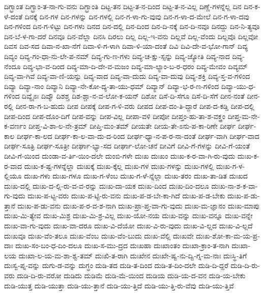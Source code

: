 {ದಿಗ್ಭ್ರಾಂತ
ದಿಗ್ಭ್ರಾಂ-ತ-ನಾ-ಗು-ವನು
ದಿಗ್ಭ್ರಾಂತಿ
ದಿಟ್ಟ-ತನ
ದಿಟ್ಟ-ತ-ನ-ದಿಂದ
ದಿಟ್ಟ-ತ-ನ-ವಿಲ್ಲ
ದಿಣ್ಣೆ-ಗಳನ್ನೆಲ್ಲ
ದಿನ
ದಿನ-ಕ-ಳೆ-ದಂತೆ
ದಿನಕ್ಕೆ
ದಿನ-ಗಳ
ದಿನ-ಗಳನ್ನು
ದಿನ-ಗಳಲ್ಲಿ
ದಿನ-ಗ-ಳಾ-ಗು-ವುವು
ದಿನ-ಗ-ಳಾ-ದ-ಮೇಲೆ
ದಿನ-ಗ-ಳಾ-ದವು
ದಿನ-ಗಳಿಂದ
ದಿನ-ಗ-ಳಿಟ್ಟು
ದಿನ-ಗಳು
ದಿನದ
ದಿನ-ದಲ್ಲಿ
ದಿನ-ದಿಂದ
ದಿನ-ದಿ-ನಕ್ಕೆ
ದಿನ-ದಿ-ನವೂ
ದಿನದ್ದು
ದಿನ-ನಿ-ತ್ಯವೂ
ದಿನ-ಬೆ-ಳ-ಗಾ-ದರೆ
ದಿನವೂ
ದಿನ-ವೆಲ್ಲಾ
ದಿನಸಿ
ದಿರಲು
ದಿಲ್ಲ
ದಿಲ್ಲ-ಇ-ವನು
ದಿಲ್ಲವೆ
ದಿಲ್ಲ-ವೆಂದು
ದಿಲ್ಲವೊ
ದಿಲ್ಲವೋ
ದಿವಸ
ದಿವ-ಸದ
ದಿವಾ-ನ-ಖಾ-ನೆಗೆ
ದಿವಾ-ಳಿ-ಗ-ಳಾಗಿ
ದಿವಾ-ಳಿ-ಯಾ-ದಂತೆ
ದಿವಿ
ದಿವಿ-ದೇ-ವ-ಭೋ-ಗಾನ್
ದಿವ್ಯ
ದಿವ್ಯಂ
ದಿವ್ಯ-ಗಂ-ಧಾ-ನು-ಲೇ-ಪ-ನಮ್
ದಿವ್ಯ-ಗು-ಣ-ಗಳು
ದಿವ್ಯ-ಚ-ಕ್ಷು-ಸ್ಸನ್ನು
ದಿವ್ಯ-ಜ್ಯೋತಿ
ದಿವ್ಯ-ನಾದ
ದಿವ್ಯ-ನೆಂದೂ
ದಿವ್ಯ-ಭಾ-ವ-ದಿಂದ
ದಿವ್ಯ-ಮಾ-ದಿ-ದೇ-ವ-ಮಜಂ
ದಿವ್ಯ-ಮಾ-ಲ್ಯಾಂ-ಬ-ರ-ಧರಂ
ದಿವ್ಯ-ಮೇವಂ
ದಿವ್ಯಮ್
ದಿವ್ಯ-ವಾ-ಗಿವೆ
ದಿವ್ಯ-ವಾ-ಣಿ-ಯನ್ನು
ದಿವ್ಯ-ವಾದ
ದಿವ್ಯ-ವಾ-ದುದು
ದಿವ್ಯ-ವಾ-ದುವು
ದಿವ್ಯ-ಶಕ್ತಿ
ದಿವ್ಯ-ಸ್ತ-ವ-ಗಳಿಂದ
ದಿವ್ಯಾ
ದಿವ್ಯಾ-ನಾಂ
ದಿವ್ಯಾನಿ
ದಿವ್ಯಾ-ನೇ-ಕೋ-ದ್ಯ-ತಾ-ಯು-ಧಮ್
ದಿವ್ಯಾನ್
ದಿವ್ಯಾ-ಭ-ರ-ಣ-ಗಳಿಂದ
ದಿವ್ಯಾ-ಯು-ಧ-ಗಳಿಂದ
ದಿವ್ಯೈಽಃ
ದಿವ್ಯೌ
ದಿಶಶ್ಚ
ದಿಶ-ಶ್ಚಾ-ನ-ವ-ಲೋ-ಕ-ಯನ್
ದಿಶೋ
ದಿಸೆ-ದಿ-ಸೆಗೂ
ದಿಸೆ-ದಿ-ಸೆಗೆ
ದೀನ-ನಂತೆ
ದೀನ-ರಲ್ಲಿ
ದೀನ-ರಾ-ಗ-ಬ-ಹುದು
ದೀಪ
ದೀಪಕ್ಕೆ
ದೀಪ-ಗ-ಳಿ-ವರು
ದೀಪದ
ದೀಪ-ದಂ-ತಿ-ದ್ದಾರೆ
ದೀಪ-ದ-ಕಡ್ಡಿ
ದೀಪ-ದಲ್ಲಿ
ದೀಪ-ದಿಂದ
ದೀಪ-ದೊಂ-ದಿಗೆ
ದೀಪ-ವನ್ನು
ದೀಪ-ವಿಲ್ಲ
ದೀಪಾ-ವಳಿ
ದೀಪೋ
ದೀಪ್ತಂ-ಹು-ತಾ-ಶ-ವಕ್ತ್ರಂ
ದೀಪ್ತ-ಮ-ನೇ-ಕ-ವರ್ಣಂ
ದೀಪ್ತ-ವಿ-ಶಾ-ಲ-ನೇ-ತ್ರಮ್
ದೀಪ್ತಿ-ಮಂ-ತಮ್
ದೀಯತೇ
ದೀಯ-ತೇ-ಽನು-ಪ-ಕಾ-ರಿಣೇ
ದೀರ್ಘ
ದೀರ್ಘ-ಕಾಲ
ದೀರ್ಘ-ಕಾ-ಲದ
ದೀರ್ಘ-ಕಾ-ಲ-ವಾ-ದು-ದ-ರಿಂದ
ದೀರ್ಘ-ಧ್ಯಾ-ನ-ಪ-ರ-ನಾ-ದಂತೆ
ದೀರ್ಘ-ವಾಗಿ
ದೀರ್ಘ-ವಾದ
ದೀರ್ಘ-ಸೂತ್ರಿ
ದೀರ್ಘ-ಸೂತ್ರೀ
ದೀರ್ಘಾ-ಭ್ಯಾ-ಸದ
ದೀರ್ಘಾ-ಲೋ-ಚನೆ
ದೀವಿಗೆ
ದೀವಿ-ಗೆ-ಗಳನ್ನು
ದೀವಿ-ಗೆ-ಯಂತೆ
ದೀವಿ-ಗೆ-ಯಿಂದ
ದುಂಡಾ-ವ-ರ್ತಿ-ಯಿಂ-ದಲೇ
ದುಂಬಿ-ಗಳೇ
ದುಃಖ
ದುಃಖಂ
ದುಃಖ-ಕ-ರ-ವಾ-ಗಿ-ರು-ವುದು
ದುಃಖ-ಕ-ರ-ವಾದ
ದುಃಖ-ಕ-ಷ್ಟ-ಗಳನ್ನೆಲ್ಲಾ
ದುಃಖಕ್ಕೆ
ದುಃಖ-ಕ್ಕೆಲ್ಲ
ದುಃಖ-ಗಳ
ದುಃಖ-ಗಳನ್ನು
ದುಃಖ-ಗಳಲ್ಲಿ
ದುಃಖ-ಗ-ಳ-ಲ್ಲಿಯೂ
ದುಃಖ-ಗಳು
ದುಃಖ-ಗಳೂ
ದುಃಖ-ಗ-ಳೆಂಬ
ದುಃಖ-ಗ-ಳೆ-ನ್ನೆಲ್ಲಾ
ದುಃಖ-ತರಂ
ದುಃಖ-ತಾ-ಡಿತ
ದುಃಖದ
ದುಃಖ-ದಲ್ಲಿ
ದುಃಖ-ದ-ಲ್ಲಿ-ರು-ವ-ವ-ರನ್ನು
ದುಃಖ-ದಾ-ಯಕ
ದುಃಖ-ದಿಂದ
ದುಃಖ-ದಿಂ-ದಲೂ
ದುಃಖ-ನಾ-ಶ-ಕ-ವಾ-ಗು-ವುದು
ದುಃಖ-ಪ-ಟ್ಟ-ವರು
ದುಃಖ-ಪ-ಟ್ಟಿ-ರು-ವನು
ದುಃಖ-ಪ-ಡ-ಬೇ-ಕಾ-ಗಿದೆ
ದುಃಖ-ಪ-ಡ-ಬೇಕು
ದುಃಖ-ಪ-ಡು-ತ್ತಾನೆ
ದುಃಖ-ಪ-ಡು-ವನು
ದುಃಖ-ಪ-ರ-ವ-ಶ-ನಾಗಿ
ದುಃಖ-ಪ್ರಾ-ಪ್ತ-ವಾ-ಗು-ವುದು
ದುಃಖ-ಮ-ಜ್ಞಾನಂ
ದುಃಖ-ಮಾಪು
ದುಃಖ-ಮಿ-ತ್ಯೇವ
ದುಃಖ-ಮಿಶ್ರ
ದುಃಖ-ಮಿ-ಶ್ರ-ವಿಲ್ಲ
ದುಃಖ-ಯೋ-ನಯ
ದುಃಖ-ವನ್ನು
ದುಃಖ-ವನ್ನೂ
ದುಃಖ-ವನ್ನೇ
ದುಃಖ-ವಾ-ಗು-ವುದು
ದುಃಖ-ವಾ-ದರೂ
ದುಃಖ-ವಿ-ದೆಯೋ
ದುಃಖ-ವಿ-ರು-ವುದು
ದುಃಖ-ವಿ-ಲ್ಲದ
ದುಃಖ-ವಿ-ಲ್ಲದೆ
ದುಃಖವೂ
ದುಃಖ-ವೆಂ-ತಲೂ
ದುಃಖ-ವೆಂಬ
ದುಃಖ-ವೆಂ-ಬುದು
ದುಃಖ-ವೆಲ್ಲಿ
ದುಃಖವೇ
ದುಃಖ-ಶೋ-ಕಾ-ಮ-ಯ-ಪ್ರ-ದಾಃ
ದುಃಖ-ಸಂ-ಬಂ-ಧ-ದಿಂ-ದಲೂ
ದುಃಖ-ಸ-ಮು-ದ್ರದ
ದುಃಖಹಾ
ದುಃಖಾಂತಂ
ದುಃಖಾ-ಕ್ರಾಂ-ತ-ನಾಗಿ
ದುಃಖಾ-ಲಯ
ದುಃಖಾ-ಲ-ಯ-ಮ-ಶಾ-ಶ್ವ-ತಮ್
ದುಃಖಿ-ತ-ರಾಗಿ
ದುಃಖೇನ
ದುಃಖೇ-ಷ್ವ-ನು-ದ್ವಿ-ಗ್ನ-ಮ-ನಾಃ
ದುಃಸ್ಥಿ-ತಿಗೆ
ದುಃಸ್ವ-ಪ್ನ-ವನ್ನು
ದುಗು-ಡ-ವನ್ನು
ದುಗ್ಧಂ
ದುಡಿ-ತದ
ದುಡಿ-ತ-ದಿಂದ
ದುಡಿ-ತ-ದಿಂ-ದಲೇ
ದುಡಿ-ದಿ-ದ್ದರೆ
ದುಡಿ-ದಿ-ರು-ವರು
ದುಡಿ-ದಿ-ರು-ವರೋ
ದುಡಿದು
ದುಡಿಮೆ
ದುಡಿ-ಮೆ-ಯಿಂದ
ದುಡಿಯ
ದುಡಿ-ಯ-ದ-ವನ
ದುಡಿ-ಯ-ಬೇಕು
ದುಡಿ-ಯುತ್ತ
ದುಡಿ-ಯುತ್ತಾ
ದುಡಿ-ಯು-ತ್ತಾನೆ
ದುಡಿ-ಯು-ತ್ತಿದೆ
ದುಡಿ-ಯು-ತ್ತಿ-ರು-ವೆವು
ದುಡಿ-ಯು-ತ್ತಿವೆ
}
